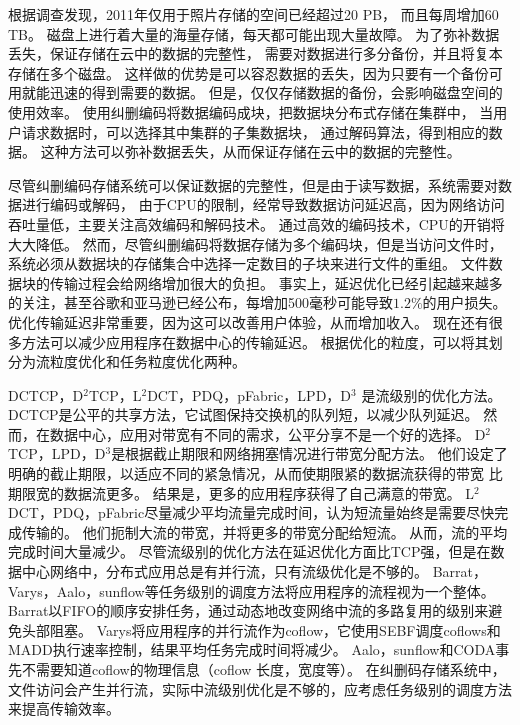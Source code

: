 根据调查发现，2011年仅用于照片存储的空间已经超过20 PB，
而且每周增加60 TB\cite{beaver2010finding,li2013erasure}。
磁盘上进行着大量的海量存储，每天都可能出现大量故障。
为了弥补数据丢失，保证存储在云中的数据的完整性，
需要对数据进行多分备份，并且将复本存储在多个磁盘。
这样做的优势是可以容忍数据的丢失，因为只要有一个备份可用就能迅速的得到需要的数据\cite{li2013erasure}。
但是，仅仅存储数据的备份，会影响磁盘空间的使用效率。
使用纠删编码将数据编码成块，把数据块分布式存储在集群中，
当用户请求数据时，可以选择其中集群的子集数据块，
通过解码算法，得到相应的数据。
这种方法可以弥补数据丢失，从而保证存储在云中的数据的完整性。

尽管纠删编码存储系统可以保证数据的完整性，但是由于读写数据，系统需要对数据进行编码或解码，
由于CPU的限制，经常导致数据访问延迟高，因为网络访问吞吐量低，\cite{dimakis606049decentralized,lin2012secure,dimakis2010network}主要关注高效编码和解码技术。
通过高效的编码技术，CPU的开销将大大降低。
然而，尽管纠删编码将数据存储为多个编码块，但是当访问文件时，系统必须从数据块的存储集合中选择一定数目的子块来进行文件的重组。
文件数据块的传输过程会给网络增加很大的负担。
事实上，延迟优化已经引起越来越多的关注，甚至谷歌和亚马逊已经公布，每增加500毫秒可能导致$1.2\%$的用户损失\cite{schurman2009user}。
优化传输延迟非常重要，因为这可以改善用户体验，从而增加收入。
现在还有很多方法可以减少应用程序在数据中心的传输延迟。
根据优化的粒度，可以将其划分为流粒度优化和任务粒度优化两种。

DCTCP\cite{DCTCP}，D$^2$TCP\cite{D2TCP}，L$^2$DCT\cite{L2DCT}，PDQ\cite{PDQ}，pFabric\cite{pFabric}，LPD\cite{LPD}，D$^3$\cite{D3}
是流级别的优化方法。DCTCP是公平的共享方法，它试图保持交换机的队列短，以减少队列延迟。
然而，在数据中心，应用对带宽有不同的需求，公平分享不是一个好的选择\cite{LPD}。 
D$^2$TCP，LPD，D$^3$是根据截止期限和网络拥塞情况进行带宽分配方法。
他们设定了明确的截止期限，以适应不同的紧急情况，从而使期限紧的数据流获得的带宽
比期限宽的数据流更多。
结果是，更多的应用程序获得了自己满意的带宽。 
L$^2$DCT，PDQ，pFabric尽量减少平均流量完成时间，认为短流量始终是需要尽快完成传输的。
他们扼制大流的带宽，并将更多的带宽分配给短流。
从而，流的平均完成时间大量减少。
尽管流级别的优化方法在延迟优化方面比TCP强，但是在数据中心网络中，分布式应用总是有并行流，只有流级优化是不够的。 
Barrat\cite{dogar2014decentralized}，Varys\cite{chowdhury2014efficient}，Aalo\cite{chowdhury2015efficient}，sunflow\cite{huang2016sunflow}等任务级别的调度方法将应用程序的流程视为一个整体。 
Barrat\cite{dogar2014decentralized}以FIFO的顺序安排任务，通过动态地改变网络中流的多路复用的级别来避免头部阻塞。 
Varys\cite{chowdhury2014efficient}将应用程序的并行流作为coflow，它使用SEBF调度coflows和MADD执行速率控制，结果平均任务完成时间将减少。 
Aalo\cite{chowdhury2015efficient}，sunflow\cite{huang2016sunflow}和CODA\cite{zhang2016coda}事先不需要知道coflow的物理信息（coflow 长度，宽度等）。
在纠删码存储系统中，文件访问会产生并行流，实际中流级别优化是不够的，应考虑任务级别的调度方法来提高传输效率。

